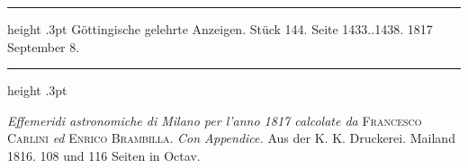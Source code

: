 \par\bigskip
\hypertarget{native-606-lower}{}
\begin{center}
\parbox{.83\linewidth}{%
\centering\small
\hrule height .3pt\relax\vspace{2.5pt}
Göttingische gelehrte Anzeigen. Stück 144. Seite 1433..1438. 1817 September 8.\par
\vspace{2.5pt}\hrule height .3pt\relax
}
\end{center}

{\setlength{\rightskip}{0pt plus 3em}\emph{Effemeridi astronomiche di Milano per l'anno \textup{1817} calcolate da} \textsc{Francesco Carlini} \emph{ed} \textsc{Enrico Brambilla}. \emph{Con Appendice.} Aus der K. K. Druckerei. Mailand 1816. 108 und 116 Seiten in Octav.\par}

